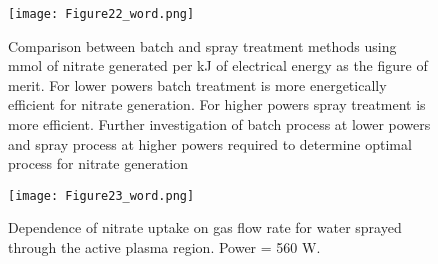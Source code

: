 \begin{figure}[htbp]
  \centering
  \texttt{[image: Figure22\_word.png]}
  \caption{Comparison between batch and spray treatment methods using mmol of nitrate generated per kJ of electrical energy as the figure of merit.  For lower powers batch treatment is more energetically efficient for nitrate generation.  For higher powers spray treatment is more efficient.  Further investigation of batch process at lower powers and spray process at higher powers required to determine optimal process for nitrate generation}
  \label{fig:nitro_compare_power}
\end{figure}

\begin{figure}[htbp]
  \centering
  \texttt{[image: Figure23\_word.png]}
  \caption{Dependence of nitrate uptake on gas flow rate for water sprayed through the active plasma region. Power = 560 W.}
  \label{fig:nitro_vs_flow_spray}
\end{figure}

